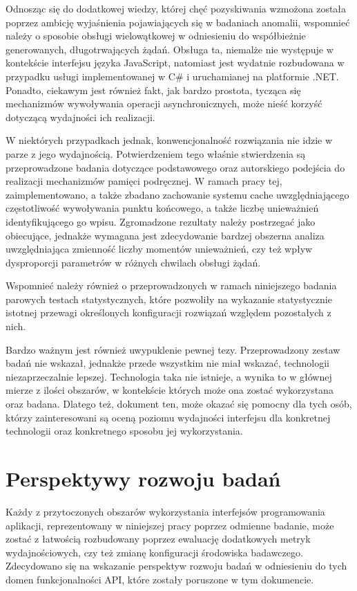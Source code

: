 Odnosząc się do dodatkowej wiedzy, której chęć pozyskiwania wzmożona została poprzez ambicję wyjaśnienia pojawiających się w badaniach anomalii, wspomnieć należy o sposobie obsługi wielowątkowej w odniesieniu do współbieżnie generowanych, długotrwających żądań. Obsługa ta, niemalże nie występuje w kontekście interfejsu języka JavaScript, natomiast jest wydatnie rozbudowana w przypadku usługi implementowanej w C\# i uruchamianej na platformie .NET. Ponadto, ciekawym jest również fakt, jak bardzo prostota, tycząca się mechanizmów wywoływania operacji asynchronicznych, może nieść korzyść dotyczącą wydajności ich realizacji.

W niektórych przypadkach jednak, konwencjonalność rozwiązania nie idzie w parze z jego wydajnością. Potwierdzeniem tego właśnie stwierdzenia są przeprowadzone badania dotyczące podstawowego oraz autorskiego podejścia do realizacji mechanizmów pamięci podręcznej. W ramach pracy tej, zaimplementowano, a także zbadano zachowanie systemu cache uwzględniającego częstotliwość wywoływania punktu końcowego, a także liczbę unieważnień identyfikującego go wpisu. Zgromadzone rezultaty należy postrzegać jako obiecujące, jednakże wymagana jest zdecydowanie bardzej obszerna analiza uwzględniająca zmienność liczby momentów unieważnień, czy też wpływ dysproporcji parametrów w różnych chwilach obsługi żądań.

Wspomnieć należy również o przeprowadzonych w ramach niniejszego badania parowych testach statystycznych, które pozwoliły na wykazanie statystycznie istotnej przewagi określonych konfiguracji rozwiązań względem pozostałych z nich. 

Bardzo ważnym jest również uwypuklenie pewnej tezy. Przeprowadzony zestaw badań nie wskazał, jednakże przede wszystkim nie miał wskazać, technologii niezaprzeczalnie lepszej. Technologia taka nie istnieje, a wynika to w głównej mierze z ilości obszarów, w kontekście których może ona zostać wykorzystana oraz badana. Dlatego też, dokument ten, może okazać się pomocny dla tych osób, którzy zainteresowani są oceną poziomu wydajności interfejsu dla konkretnej technologii oraz konkretnego sposobu jej wykorzystania.
\section{Perspektywy rozwoju badań}
Każdy z przytoczonych obszarów wykorzystania interfejsów programowania aplikacji, reprezentowany w niniejszej pracy poprzez odmienne badanie, może zostać z łatwością rozbudowany poprzez ewaluację dodatkowych metryk wydajnościowych, czy też zmianę konfiguracji środowiska badawczego. Zdecydowano się na wskazanie perspektyw rozwoju badań w odniesieniu do tych domen funkcjonalności API, które zostały poruszone w tym dokumencie.

